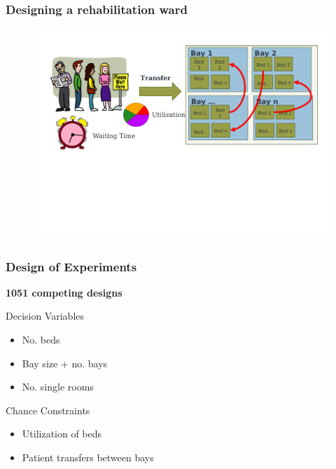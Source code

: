 \documentclass[aspectratio=169]{beamer}
\begin{document}


\begin{frame}
\frametitle{Designing a rehabilitation ward}
\begin{figure}
\includegraphics[width=1.0\linewidth]{ward6a.pdf}
\end{figure}
\end{frame}



\begin{frame}
\frametitle{Design of Experiments}

\textbf{1051 competing designs}
    \begin{block}{Decision Variables}
        \begin{itemize}
            \item No. beds 
            \item Bay size + no. bays
            \item No. single rooms  
        \end{itemize}
    \end{block}
    
    
    \begin{block}{Chance Constraints}
        \begin{itemize}
            \item Utilization of beds 
            \item Patient transfers between bays
        \end{itemize}
    \end{block}


\end{frame}
\end{document}
